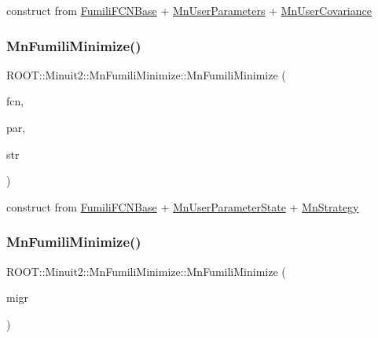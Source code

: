 construct from \mbox{\hyperlink{classROOT_1_1Minuit2_1_1FumiliFCNBase}{Fumili\+F\+C\+N\+Base}} + \mbox{\hyperlink{classROOT_1_1Minuit2_1_1MnUserParameters}{Mn\+User\+Parameters}} + \mbox{\hyperlink{classROOT_1_1Minuit2_1_1MnUserCovariance}{Mn\+User\+Covariance}} 

\mbox{\label{classROOT_1_1Minuit2_1_1MnFumiliMinimize_ad8292150eb4f2642fb583f0cec00ed7b}} 
\subsubsection{\texorpdfstring{MnFumiliMinimize()}{MnFumiliMinimize()}\hspace{0.1cm}{\footnotesize\ttfamily [13/21]}}
{\footnotesize\ttfamily R\+O\+O\+T\+::\+Minuit2\+::\+Mn\+Fumili\+Minimize\+::\+Mn\+Fumili\+Minimize (\begin{DoxyParamCaption}\item[{const \mbox{\hyperlink{classROOT_1_1Minuit2_1_1FumiliFCNBase}{Fumili\+F\+C\+N\+Base}} \&}]{fcn,  }\item[{const \mbox{\hyperlink{classROOT_1_1Minuit2_1_1MnUserParameterState}{Mn\+User\+Parameter\+State}} \&}]{par,  }\item[{const \mbox{\hyperlink{classROOT_1_1Minuit2_1_1MnStrategy}{Mn\+Strategy}} \&}]{str }\end{DoxyParamCaption})\hspace{0.3cm}{\ttfamily [inline]}}



construct from \mbox{\hyperlink{classROOT_1_1Minuit2_1_1FumiliFCNBase}{Fumili\+F\+C\+N\+Base}} + \mbox{\hyperlink{classROOT_1_1Minuit2_1_1MnUserParameterState}{Mn\+User\+Parameter\+State}} + \mbox{\hyperlink{classROOT_1_1Minuit2_1_1MnStrategy}{Mn\+Strategy}} 

\mbox{\label{classROOT_1_1Minuit2_1_1MnFumiliMinimize_a082eb87753b71a4d383ff8d735dc8410}} 
\subsubsection{\texorpdfstring{MnFumiliMinimize()}{MnFumiliMinimize()}\hspace{0.1cm}{\footnotesize\ttfamily [14/21]}}
{\footnotesize\ttfamily R\+O\+O\+T\+::\+Minuit2\+::\+Mn\+Fumili\+Minimize\+::\+Mn\+Fumili\+Minimize (\begin{DoxyParamCaption}\item[{const \mbox{\hyperlink{classROOT_1_1Minuit2_1_1MnFumiliMinimize}{Mn\+Fumili\+Minimize}} \&}]{migr }\end{DoxyParamCaption})\hspace{0.3cm}{\ttfamily [inline]}}

